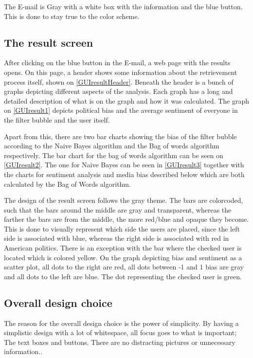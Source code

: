 
The E-mail is Gray with a white box with the information and the blue button.
This is done to stay true to the color scheme. 

\subsection{The result screen}
After clicking on the blue button in the E-mail, a web page with the results
opens. On this page, a header shows some information about the retrievement
process itself, shown on \autoref{GUIresultHeader}. Beneath
the header is a bunch of graphs depicting different aspects of the analysis.
Each graph has a long and detailed description of what is on the graph and how
it was calculated. The graph on \autoref{GUIresult1} depicts political bias and
the average sentiment of everyone in the filter bubble and the user itself. 


Apart from this, there are two bar charts showing the bias of the
filter bubble according to the Naive Bayes algorithm and the Bag of words
algorithm respectively. The bar chart for the bag of words algorithm can be seen
on \autoref{GUIresult2}. The one for Naive Bayes can be seen in
\autoref{GUIresult3} together with the charts for
sentiment analysis and media bias described below which are both calculated by the Bag of Words algorithm.


The design of the result screen follows the gray theme. The bars are colorcoded,
such that the bars around the middle are gray and transparent, whereas the
farther the bars are from the middle, the more red/blue and opaque they become.
This is done to visually represent which side the users are placed, since the
left side is associated with blue, whereas the right side is associated with red
in American politics. There is an exception with the bar where the checked user
is located which is colored yellow. On the graph depicting bias and sentiment as
a scatter plot, all dots to the right are red, all dots between -1 and 1 bias are
gray and all dots to the left are blue. The dot representing the checked user
is green.

\subsection{Overall design choice}
The reason for the overall design choice is the power of simplicity. By having a
simplistic design with a lot of whitespace, all focus goes to what is
important; The text boxes and buttons. There are no distracting
pictures or unnecessary information.\citep[p. 26 \& 32]{WebUI}.\\